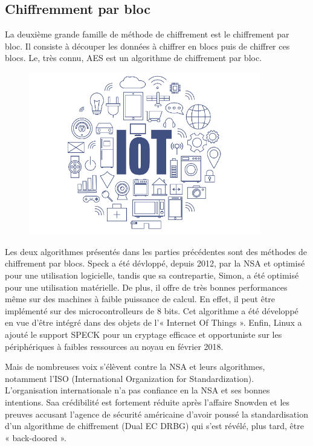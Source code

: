 			\subsection{Chiffremment par bloc}
			
			La deuxième grande famille de méthode de chiffrement est le chiffrement par bloc. Il consiste à découper les données à chiffrer en blocs puis de chiffrer ces blocs.
			Le, très connu, AES est un algorithme de chiffrement par bloc.
			
			\begin{figure}[!h]
				\centering
				\includegraphics[width=0.9\textwidth]{imgs/application/IOT.jpg}
				\label{IOT}
			\end{figure}
			
			Les deux algorithmes présentés dans les parties précédentes sont des méthodes de chiffrement par blocs.
			Speck a été dévloppé, depuis 2012, par la NSA et optimisé pour une utilisation logicielle, tandis que sa contrepartie, Simon, a été optimisé pour une utilisation matérielle.
			De plus, il offre de très bonnes performances même sur des machines à faible puissance de calcul.
			En effet, il peut être implémenté sur des microcontrolleurs de 8 bits.
			Cet algorithme a été développé en vue d'être intégré dans des objets de l'« Internet Of Things ».
			Enfin, Linux a ajouté le support SPECK pour un cryptage efficace et opportuniste sur les périphériques à faibles ressources au noyau en février 2018.
			
			Mais de nombreuses voix s'élèvent contre la NSA et leurs algorithmes, notamment l'ISO (International Organization for Standardization).
			L'organisation internationale n'a pas confiance en la NSA et ses bonnes intentions.
			Saa crédibilité est fortement réduite après l'affaire Snowden et les preuves accusant l'agence de sécurité américaine d'avoir poussé la standardisation d'un algorithme de chiffrement (Dual EC DRBG) qui s'est révélé, plus tard, être « back-doored »\cite{NSABackdoor}.
			
